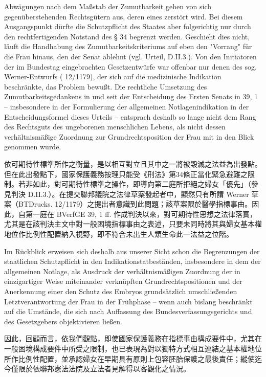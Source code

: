 \documentclass[12pt]{article}
\begin{document}
\begin{sourcepara}[title={原文SondervotumMS.287}]
Abwägungen nach dem Maßstab der Zumutbarkeit gehen von sich gegenüberstehenden Rechtsgütern aus, deren eines zerstört wird. Bei diesem Ausgangspunkt dürfte die Schutzpflicht des Staates aber folgerichtig nur durch den rechtfertigenden Notstand des § 34 \abbrStGB{} begrenzt werden. Geschieht dies nicht, läuft die Handhabung des Zumutbarkeitskriteriums auf eben den "Vorrang" für die Frau hinaus, den der Senat ablehnt (vgl. Urteil, D.II.3.). Von den Initiatoren der im Bundestag eingebrachten Gesetzentwürfe war offenbar nur denen des sog. Werner-Entwurfs (\abbrBTDrucks{} 12/1179), der sich auf die medizinische Indikation beschränkte, das Problem bewußt. Die rechtliche Umsetzung des Zumutbarkeitsgedankens in und seit der Entscheidung des Ersten Senats in \abbrBVerfGE{} 39, 1 \abbrFF{} -- insbesondere in der Formulierung der allgemeinen Notlagenindikation in der Entscheidungsformel dieses Urteils -- entsprach deshalb so lange nicht dem Rang des Rechtsguts des ungeborenen menschlichen Lebens, als nicht dessen verhältnismäßige Zuordnung zur Grundrechtsposition der Frau mit in den Blick genommen wurde.
\end{sourcepara}
\begin{transpara}
依可期待性標準所作之衡量，是以相互對立且其中之一將被毀滅之法益為出發點。但在此出發點下，國家保護義務按理只能受《刑法》第34條正當化緊急避難之限制。若非如此，對可期待性標準之操作，即導向第二庭所拒絕之婦女「優先」（參見判決 D.II.3.）。在提交聯邦議院之法律草案發起者中，顯然只有所謂 Werner 草案（BTDrucks. 12/1179）之提出者意識到此問題；該草案限於醫學指標事由。因此，自第一庭在 BVerfGE 39, 1 ff. 作成判決以來，對可期待性思想之法律落實，尤其是在該判決主文中對一般困境指標事由之表述，只要未同時將其與婦女基本權地位作比例性配置納入視野，即不符合未出生人類生命此一法益之位階。
\end{transpara}

\begin{sourcepara}[title={原文SondervotumMS.288}]
Im Rückblick erweisen sich deshalb aus unserer Sicht schon die Begrenzungen der staatlichen Schutzpflicht in den Indikationstatbeständen, insbesondere in dem der allgemeinen Notlage, als Ausdruck der verhältnismäßigen Zuordnung der in einzigartiger Weise miteinander verknüpften Grundrechtspositionen und der Anerkennung einer den Schutz des Embryos grundsätzlich umschließenden Letztverantwortung der Frau in der Frühphase -- wenn auch bislang beschränkt auf die Umstände, die sich nach Auffassung des Bundesverfassungsgerichts und des Gesetzgebers objektivieren ließen.
\end{sourcepara}
\begin{transpara}
因此，回顧而言，依我們觀點，即使國家保護義務在指標事由構成要件中，尤其在一般困境構成要件中所受之限制，也已表現為對以獨特方式相互連結之基本權地位所作比例性配置，並承認婦女在早期具有原則上包容胚胎保護之最後責任；縱使迄今僅限於依聯邦憲法法院及立法者見解得以客觀化之情況。
\end{transpara}
\end{document}
